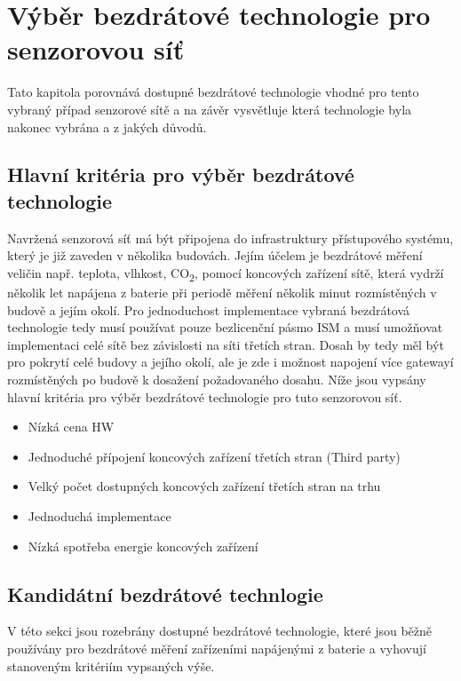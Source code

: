 \chapter{Výběr bezdrátové technologie pro senzorovou síť}
Tato kapitola porovnává dostupné bezdrátové technologie vhodné pro tento vybraný případ senzorové sítě a na závěr vysvětluje která technologie byla nakonec vybrána a z jakých důvodů.


\section{Hlavní kritéria pro výběr bezdrátové technologie}
Navržená senzorová síť má být připojena do infrastruktury přístupového systému, který je již zaveden v několika budovách. Jejím účelem je bezdrátové měření veličin např. teplota, vlhkost, CO\textsubscript{2}, pomocí koncových zařízení sítě, která vydrží několik let napájena z baterie při periodě měření několik minut rozmístěných v budově a jejím okolí.
Pro jednoduchost implementace vybraná bezdrátová technologie tedy musí používat pouze bezlicenční pásmo ISM a musí umožňovat implementaci celé sítě bez závislosti na síti třetích stran. 
Dosah by tedy měl být pro pokrytí celé budovy a jejího okolí, ale je zde i možnost napojení více gatewayí rozmístěných po budově k dosažení požadovaného dosahu.
Níže jsou vypsány hlavní kritéria pro výběr bezdrátové technologie pro tuto senzorovou síť.

\begin{itemize}
  \item Nízká cena HW
  \item Jednoduché přípojení koncových zařízení třetích stran (Third party)
  \item Velký počet dostupných koncových zařízení třetích stran na trhu 
  \item Jednoduchá implementace
  \item Nízká spotřeba energie koncových zařízení
\end{itemize}

\section{Kandidátní bezdrátové technlogie}
V této sekci jsou rozebrány dostupné bezdrátové technologie, které jsou běžně používány pro bezdrátové měření zařízeními napájenými z baterie a vyhovují stanoveným kritériím vypsaných výše.

